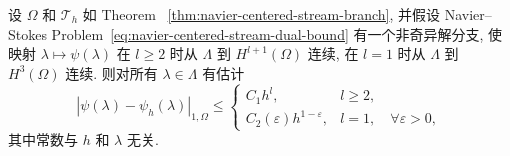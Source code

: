 \setcounter{statement}{4}
\begin{Theorem}\label{thm:navier-centered-stream-h1-error}
设 $\Omega$ 和 $\mathcal T_h$ 如 Theorem~
\ref{thm:navier-centered-stream-branch}, 并假设 Navier--Stokes
Problem~\eqref{eq:navier-centered-stream-dual-bound} 有一个非奇异解分支,
使映射 $\lambda\mapsto\psi(\lambda)$ 在 $l\geq2$ 时从 $\Lambda$ 到
$H^{l+1}(\Omega)$ 连续, 在 $l=1$ 时从 $\Lambda$ 到 $H^3(\Omega)$ 连续.
则对所有 $\lambda\in\Lambda$ 有估计
\begin{equation}\label{eq:navier-centered-stream-h1-error}
|\psi(\lambda)-\psi_h(\lambda)|_{1,\Omega}
\leq
\begin{cases}
C_1h^l,&l\geq2,\\
C_2(\varepsilon)h^{1-\varepsilon},&l=1,
\quad\forall\varepsilon>0,
\end{cases}
\end{equation}
其中常数与 $h$ 和 $\lambda$ 无关.
\end{Theorem}

